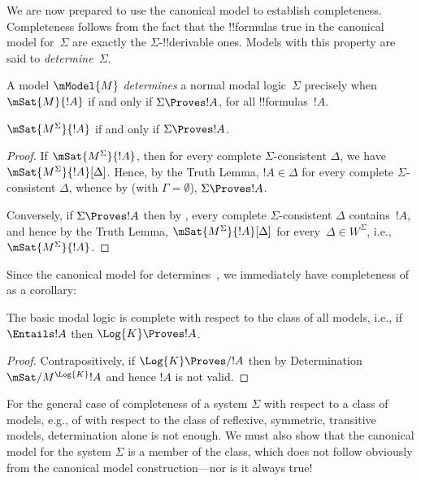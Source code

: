 \documentclass[../../../include/open-logic-section]{subfiles}
\begin{document}


We are now prepared to use the canonical model to establish
completeness. Completeness follows from the fact that the !!{formula}s
true in the canonical model for~$\Sigma$ are exactly the
$\Sigma$-!!{derivable} ones. Models with this property are said to
\emph{determine}~$\Sigma$.

\begin{defn}
  A model $\mModel{M}$ \emph{determines} a normal modal
  logic~$\Sigma$ precisely when $\mSat{M}{!A}$ if and only if $\Sigma
  \Proves !A$, for all !!{formula}s~$!A$.
\end{defn}

\begin{thm}[Determination]
   $\mSat{M^\Sigma}{!A}$ if and only if $\Sigma \Proves !A$.
\end{thm}

\begin{proof}
  If $\mSat{M^\Sigma}{!A}$, then for every complete
  $\Sigma$-consistent $\Delta$, we have
  $\mSat{M^\Sigma}{!A}[\Delta]$. Hence, by the Truth Lemma, $!A \in
  \Delta$ for every complete $\Sigma$-consistent $\Delta$, whence by
   (with $\Gamma =
  \emptyset$), $\Sigma \Proves !A$.

  Conversely, if $\Sigma \Proves !A$ then by
  , every
  complete $\Sigma$-consistent $\Delta$ contains~$!A$, and hence by
  the Truth Lemma, $\mSat{M^\Sigma}{!A}[\Delta]$ for every~$\Delta \in
  W^\Sigma$, i.e., $\mSat{M^\Sigma}{!A}$.
\end{proof}

Since the canonical model for  determines~, we
immediately have completeness of~ as a corollary:

\begin{cor}
  The basic modal logic  is complete with respect to the
  class of all models, i.e., if $\Entails !A$ then $\Log{K}
  \Proves !A$.
\end{cor}

\begin{proof}
  Contrapositively, if $\Log{K} \Proves/ !A$ then by Determination
  $\mSat/{M^{\Log{K}}}{!A}$ and hence $!A$ is not valid.
\end{proof}

For the general case of completeness of a system $\Sigma$ with respect
to a class of models, e.g., of  with respect to the class of
reflexive, symmetric, transitive models, determination alone is not
enough.  We must also show that the canonical model for the system
$\Sigma$ is a member of the class, which does not follow obviously
from the canonical model construction---nor is it always true!
\end{document}
